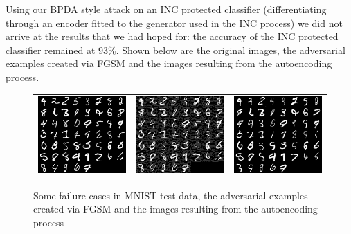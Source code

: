 \documentclass{article}
\theoremstyle{definition}
\begin{document}
Using our BPDA style attack on an INC protected classifier (differentiating through an encoder fitted to the generator used in the INC process) we did not arrive at the results that we had hoped for: the accuracy of the INC protected classifier remained at 93\%. Shown below are the original images, the adversarial examples created via FGSM and the images resulting from the autoencoding process.

\begin{figure}[H]
\centering
\begin{tabular}{ccc}
\includegraphics[width=2in]{cl_original.png} &
\includegraphics[width=2in]{cl_adversarial.png} &
\includegraphics[width=2in]{cl_reconstr.png}
\end{tabular}
\caption{Some failure cases in MNIST test data, the adversarial examples created via FGSM and the images resulting from the autoencoding process}
\end{figure}
\end{document}

